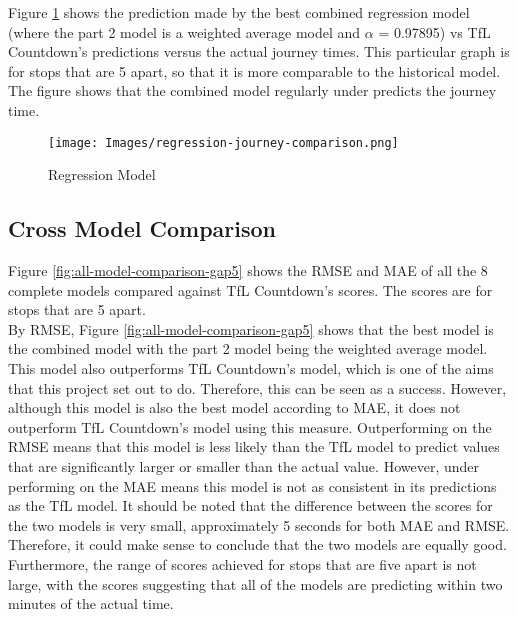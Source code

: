 Figure \ref{fig:regression-gap5-journey-comparison} shows the prediction made by the best combined regression model (where the part 2 model is a weighted average model and $\alpha$ = 0.97895) vs TfL Countdown's predictions versus the actual journey times. This particular graph is for stops that are 5 apart, so that it is more comparable to the historical model. The figure shows that the combined model regularly under predicts the journey time.

\begin{figure}[H]
\begin{center}
    \texttt{[image: Images/regression-journey-comparison.png]}
    \caption{Regression Model}
    \label{fig:regression-gap5-journey-comparison}
\end{center}
\end{figure}

\subsection{Cross Model Comparison}

Figure \ref{fig:all-model-comparison-gap5} shows the RMSE and MAE of all the 8 complete models compared against TfL Countdown's scores. The scores are for stops that are 5 apart. \\

By RMSE, Figure \ref{fig:all-model-comparison-gap5} shows that the best model is the combined model with the part 2 model being the weighted average model. This model also outperforms TfL Countdown's model, which is one of the aims that this project set out to do. Therefore, this can be seen as a success. However, although this model is also the best model according to MAE, it does not outperform TfL Countdown's model using this measure. Outperforming on the RMSE means that this model is less likely than the TfL model to predict values that are significantly larger or smaller than the actual value. However, under performing on the MAE means this model is not as consistent in its predictions as the TfL model. It should be noted that the difference between the scores for the two models is very small, approximately 5 seconds for both MAE and RMSE. Therefore, it could make sense to conclude that the two models are equally good. Furthermore, the range of scores achieved for stops that are five apart is not large, with the scores suggesting that all of the models are predicting within two minutes of the actual time. \\

